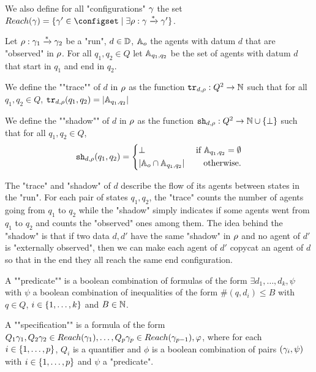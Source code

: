 We also define for all "configurations" $\gamma$ the set $\Reach(\config) = \set{\config' \in \configset \mid \exists \run : \config \xrightarrow{*} \config'}$.


\begin{definition}
	Let $\rho : \gamma_1 \xrightarrow{*} \gamma_2$ be a "run", $d\in \mathbb{D}$, $\mathbb{A}_o$ the agents with datum $d$ that are "observed" in $\rho$. For all $q_1, q_2 \in Q$ let $\mathbb{A}_{q_1, q_2}$ be the set of agents with datum $d$ that start in $q_1$ and end in $q_2$.
	
	We define the ""trace"" of $d$ in $\rho$ as the function $\mathtt{tr}_{d,\rho} : Q^2 \to \mathbb{N}$ such that for all $q_1, q_2 \in Q$,	$\mathtt{tr}_{d,\rho}(q_1, q_2) = |\mathbb{A}_{q_1, q_2}|$
		
	
	We define the ""shadow"" of $d$ in $\rho$ as the function $\mathtt{sh}_{d,\rho} : Q^2 \to \mathbb{N} \cup \{\bot\}$ such that for all $q_1, q_2 \in Q$, 
	\begin{equation}
		\mathtt{sh}_{d,\rho}(q_1, q_2) = 
		\left\{
		\begin{aligned}
			&\bot &\text{ if } \mathbb{A}_{q_1,q_2} =\emptyset\\
			&|\mathbb{A}_o \cap \mathbb{A}_{q_1, q_2}| &\text{ otherwise.}
		\end{aligned}
		\right.
	\end{equation}
\end{definition}
%	
The "trace" and "shadow" of $d$ describe the flow of its agents between states in the "run". For each pair of states $q_1, q_2$, the "trace" counts the number of agents going from $q_1$ to $q_2$ while
the "shadow" simply indicates if some agents went from $q_1$ to $q_2$ and counts the "observed" ones among them. The idea behind the "shadow" is that if two data $d, d'$ have the same "shadow" in $\rho$ and no agent of $d'$ is "externally observed", then we can make each agent of $d'$ copycat an agent of $d$ so that in the end they all reach the same end configuration.


\begin{definition}
	A ""predicate"" is a boolean combination of formulas of the form $\exists d_1, \ldots, d_k, \psi$ with $\psi$ a boolean combination of inequalities of the form $\#(q,d_i) \leq B$ with $q\in Q$, $i \in \{1,\dots,k\}$ and $B \in \mathbb{N}$.
	
	A ""specification"" is a formula of the form $Q_1 \gamma_1, Q_2 \gamma_2  \in Reach(\gamma_1), \ldots, Q_p \gamma_p \in Reach(\gamma_{p-1}), \varphi$, where for each $i \in \{1,\dots,p\}$, $Q_i$ is a quantifier and $\phi$ is a boolean combination of pairs $(\gamma_i, \psi)$ with $i \in \{1,\dots,p\}$ and $\psi$ a "predicate".
\end{definition}
